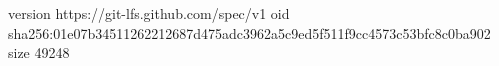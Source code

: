 version https://git-lfs.github.com/spec/v1
oid sha256:01e07b34511262212687d475adc3962a5c9ed5f511f9cc4573c53bfc8c0ba902
size 49248
